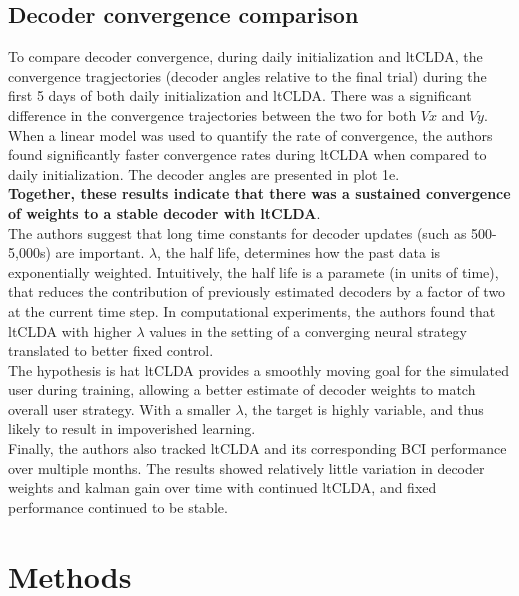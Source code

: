 \documentclass[11pt, a4paper, openany]{report}
\theoremstyle{definition}
\theoremstyle{remark}
\begin{document}
\subsection{Decoder convergence comparison}
To compare decoder convergence, during daily initialization and ltCLDA, the convergence tragjectories (decoder angles relative to the final trial) during the first 5 days of both daily initialization and ltCLDA. There was a significant difference in the convergence trajectories between the two for both \( Vx \) and \( Vy \). \\

When a linear model was used to quantify the rate of convergence, the authors found significantly faster convergence rates during ltCLDA when compared to daily initialization. The decoder angles are presented in plot 1e.\\

\textbf{Together, these results indicate that there was a sustained convergence of weights to a stable decoder with ltCLDA}.\\

The authors suggest that long time constants for decoder updates (such as 500-5,000s) are important. \( \lambda \), the half life, determines how the past data is exponentially weighted. Intuitively, the half life is a paramete (in units of time), that reduces the contribution of previously estimated decoders by a factor of two at the current time step. In computational experiments, the authors found that ltCLDA with higher \( \lambda \) values in the setting of a converging neural strategy translated to better fixed control.\\

The hypothesis is hat ltCLDA provides a smoothly moving goal for the simulated user during training, allowing a better estimate of decoder weights to match overall user strategy. With a smaller \( \lambda \), the target is highly variable, and thus likely to result in impoverished learning. \\

Finally, the authors also tracked ltCLDA and its corresponding BCI performance over multiple months. The results showed relatively little variation in decoder weights and kalman gain over time with continued ltCLDA, and fixed performance continued to be stable. 


\section{Methods}
\end{document}
